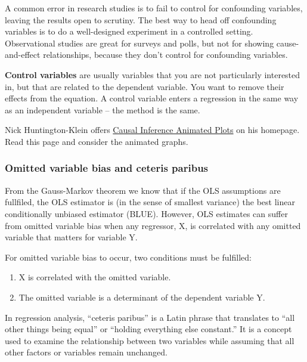 \documentclass[
  12pt,
  oneside]{book}
\providecommand{\tightlist}{%
  \setlength{\itemsep}{0pt}\setlength{\parskip}{0pt}}
\theoremstyle{definition}
\theoremstyle{definition}
\theoremstyle{definition}
\theoremstyle{definition}
\theoremstyle{remark}
\begin{document}
A common error in research studies is to fail to control for confounding variables, leaving the results open to scrutiny. The best way to head off confounding variables is to do a well-designed experiment in a controlled setting. Observational studies are great for surveys and polls, but not for showing cause-and-effect relationships, because they don't control for confounding variables.

\textbf{Control variables} are usually variables that you are not particularly interested in, but that are related to the dependent variable. You want to remove their effects from the equation. A control variable enters a regression in the same way as an independent variable -- the method is the same.

Nick Huntington-Klein offers \href{https://www.nickchk.com/causalgraphs.html}{Causal Inference Animated Plots} on his homepage. Read this page and consider the animated graphs.

\hypertarget{omitted-variable-bias-and-ceteris-paribus}{%
\subsubsection{Omitted variable bias and ceteris paribus}\label{omitted-variable-bias-and-ceteris-paribus}}

From the Gauss-Markov theorem we know that if the OLS assumptions are fullfiled, the OLS estimator is (in the sense of smallest variance) the best linear conditionally unbiased estimator (BLUE).
However, OLS estimates can suffer from omitted variable bias when any regressor, X, is correlated with any omitted variable that matters for variable Y.

For omitted variable bias to occur, two conditions must be fulfilled:

\begin{enumerate}
\def\labelenumi{\arabic{enumi}.}
\tightlist
\item
  X is correlated with the omitted variable.
\item
  The omitted variable is a determinant of the dependent variable Y.
\end{enumerate}

In regression analysis, ``ceteris paribus'' is a Latin phrase that translates to ``all other things being equal'' or ``holding everything else constant.'' It is a concept used to examine the relationship between two variables while assuming that all other factors or variables remain unchanged.
\end{document}
